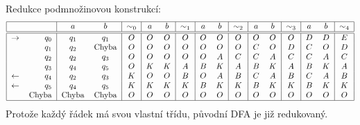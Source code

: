 Redukce podmnožinovou konstrukcí:
\[
\begin{tabular}{|r r|c c|c|c c|c|c c|c|c c|c|c c|c|}
    \hline
    & & $a$ & $b$ & $\sim_0$ & $a$ & $b$ & $\sim_1$ & $a$ & $b$ & $\sim_2$ & $a$ & $b$ & $\sim_3$ & $a$ & $b$ & $\sim_4$\\
    \hline
    \hline
    $\rightarrow$ & $q_0$ &$q_1$ &$q_1$ &$O$ &$O$ &$O$ &$O$ &$O$ &$O$ &$O$ &$O$ &$O$ &$O$ &$D$ &$D$ &$E$\\
                  & $q_1$ &$q_2$ &Chyba &$O$ &$O$ &$O$ &$O$ &$O$ &$O$ &$O$ &$C$ &$O$ &$D$ &$C$ &$O$ &$D$\\
                  & $q_2$ &$q_2$ &$q_3$ &$O$ &$O$ &$O$ &$O$ &$O$ &$A$ &$C$ &$C$ &$A$ &$C$ &$C$ &$A$ &$C$\\
                  & $q_3$ &$q_4$ &$q_5$ &$O$ &$K$ &$K$ &$A$ &$B$ &$K$ &$A$ &$B$ &$K$ &$A$ &$B$ &$K$ &$A$\\
    $\leftarrow$  & $q_4$ &$q_2$ &$q_3$ &$K$ &$O$ &$O$ &$B$ &$O$ &$A$ &$B$ &$C$ &$A$ &$B$ &$C$ &$A$ &$B$\\
    $\leftarrow$  & $q_5$ &$q_4$ &$q_5$ &$K$ &$K$ &$K$ &$K$ &$B$ &$K$ &$K$ &$B$ &$K$ &$K$ &$B$ &$K$ &$K$\\
                  & Chyba &Chyba &Chyba &$O$ &$O$ &$O$ &$O$ &$O$ &$O$ &$O$ &$O$ &$O$ &$O$ &$O$ &$O$ &$O$\\
    \hline
\end{tabular}
\]
Protože každý řádek má svou vlastní třídu, původní DFA je již redukovaný.
